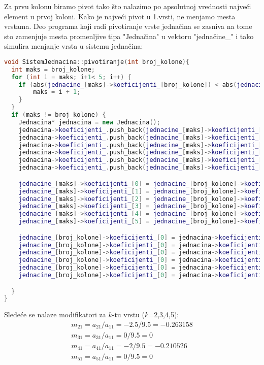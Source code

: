 \documentclass[12pt,leqno,a4paper]{article}
\begin{document}
Za prvu kolonu biramo pivot tako \v sto nalazimo po apsolutnoj vrednosti najve\' ci element u prvoj koloni. Kako je najve\' ci pivot u 1.vrsti, ne menjamo mesta vrstama.
Deo programa koji radi pivotiranje vrste jedna\v cina se zasniva na tome sto zamenjuje mesta promenljive tipa "Jedna\v cina" u vektoru "jedna\v cine_" i tako simulira menjanje vrsta u sistemu jedna\v cina:\\


\begin{lstlisting}[language=C++ ]
void SistemJednacina::pivotiranje(int broj_kolone){
  int maks = broj_kolone;
  for (int i = maks; i+1< 5; i++) {
	if (abs(jednacine_[maks]->koeficijenti_[broj_kolone]) < abs(jednacine_[i + 1]->koeficijenti_[broj_kolone])) {
		maks = i + 1;
	}
  }
  if (maks != broj_kolone) {
	Jednacina* jednacina = new Jednacina();
	jednacina->koeficijenti_.push_back(jednacine_[maks]->koeficijenti_[0]);
	jednacina->koeficijenti_.push_back(jednacine_[maks]->koeficijenti_[1]);
	jednacina->koeficijenti_.push_back(jednacine_[maks]->koeficijenti_[2]);
	jednacina->koeficijenti_.push_back(jednacine_[maks]->koeficijenti_[3]);
	jednacina->koeficijenti_.push_back(jednacine_[maks]->koeficijenti_[4]);
	jednacina->koeficijenti_.push_back(jednacine_[maks]->koeficijenti_[5]);

	jednacine_[maks]->koeficijenti_[0] = jednacine_[broj_kolone]->koeficijenti_[0];
	jednacine_[maks]->koeficijenti_[1] = jednacine_[broj_kolone]->koeficijenti_[1];
	jednacine_[maks]->koeficijenti_[2] = jednacine_[broj_kolone]->koeficijenti_[2];
	jednacine_[maks]->koeficijenti_[3] = jednacine_[broj_kolone]->koeficijenti_[3];
	jednacine_[maks]->koeficijenti_[4] = jednacine_[broj_kolone]->koeficijenti_[4];
	jednacine_[maks]->koeficijenti_[5] = jednacine_[broj_kolone]->koeficijenti_[5];

	jednacine_[broj_kolone]->koeficijenti_[0] = jednacina->koeficijenti_[0];
	jednacine_[broj_kolone]->koeficijenti_[0] = jednacina->koeficijenti_[1];
	jednacine_[broj_kolone]->koeficijenti_[0] = jednacina->koeficijenti_[2];
	jednacine_[broj_kolone]->koeficijenti_[0] = jednacina->koeficijenti_[3];
	jednacine_[broj_kolone]->koeficijenti_[0] = jednacina->koeficijenti_[4];
	jednacine_[broj_kolone]->koeficijenti_[0] = jednacina->koeficijenti_[5];

  }
}
\end{lstlisting}
Slede\' ce se nalaze modifikatori za $k$-tu vrstu ($k$=2,3,4,5):
\begin{equation*}
  \begin{aligned}
    m_{21}=a_{21}/a_{11}=-2.5/9.5=-0.263158\\
    m_{31}=a_{31}/a_{11}=0/9.5=0\\
    m_{41}=a_{41}/a_{11}=-2/9.5=-0.210526\\
    m_{51}=a_{51}/a_{11}=0/9.5=0\\
\end{aligned}
\end{equation*}
\end{document}

